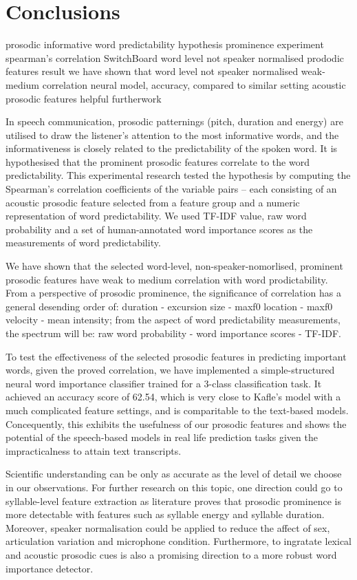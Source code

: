 \chapter{Conclusions}

prosodic informative word predictability
hypothesis prominence
experiment spearman's correlation SwitchBoard word level not speaker normalised prododic features
result we have shown that 
	word level not speaker normalised weak-medium correlation
neural model, accuracy, compared to similar setting
	acoustic prosodic features helpful
furtherwork

In speech communication, prosodic patternings (pitch, duration and energy) are utilised to draw the listener's attention to the most informative words, and the informativeness is closely related to the predictability of the spoken word. It is hypothesised that the prominent prosodic features correlate to the word predictability. This experimental research tested the hypothesis by computing the Spearman's correlation coefficients of the variable pairs -- each consisting of an acoustic prosodic feature selected from a feature group and a numeric representation of word predictability. We used TF-IDF value, raw word probability and a set of human-annotated word importance scores as the measurements of word predictability.

We have shown that the selected word-level, non-speaker-nomorlised, prominent prosodic features have weak to medium correlation with word prodictability. From a perspective of prosodic prominence, the significance of correlation has a general desending order of: duration - excursion size - maxf0 location - maxf0 velocity - mean intensity; from the aspect of word predictability measurements, the spectrum will be: raw word probability - word importance scores - TF-IDF.

To test the effectiveness of the selected prosodic features in predicting important words, given the proved correlation, we have implemented a simple-structured neural word importance classifier trained for a 3-class classification task. It achieved an accuracy score of 62.54, which is very close to Kafle's model with a much complicated feature settings, and is comparitable to the text-based models. Concequently, this exhibits the usefulness of our prosodic features and shows the potential of the speech-based models in real life prediction tasks given the impracticalness to attain text transcripts.

Scientific understanding can be only as accurate as the level of detail we choose in our observations. For further research on this topic, one direction could go to syllable-level feature extraction as literature proves that prosodic prominence is more detectable with features such as syllable energy and syllable duration. Moreover, speaker normalisation could be applied to reduce the affect of sex, articulation variation and microphone condition. Furthermore, to ingratate lexical and acoustic prosodic cues is also a promising direction to a more robust word importance detector.

